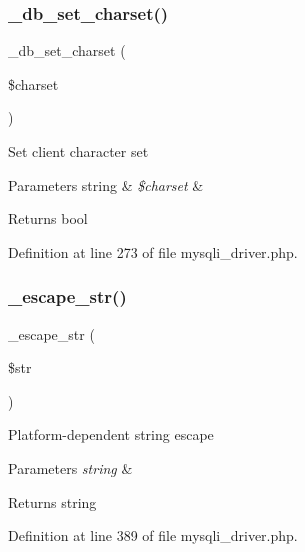 \subsubsection{\texorpdfstring{\_db\_set\_charset()}{\_db\_set\_charset()}}
{\footnotesize\ttfamily \+\_\+db\+\_\+set\+\_\+charset (\begin{DoxyParamCaption}\item[{}]{\$charset }\end{DoxyParamCaption})\hspace{0.3cm}{\ttfamily [protected]}}

Set client character set


\begin{DoxyParams}[1]{Parameters}
string & {\em \$charset} & \\
\hline
\end{DoxyParams}
\begin{DoxyReturn}{Returns}
bool 
\end{DoxyReturn}


Definition at line 273 of file mysqli\+\_\+driver.\+php.

\mbox{\label{class_c_i___d_b__mysqli__driver_af8ef0237bfcdb19215b63fff769e7a55}} 
\subsubsection{\texorpdfstring{\_escape\_str()}{\_escape\_str()}}
{\footnotesize\ttfamily \+\_\+escape\+\_\+str (\begin{DoxyParamCaption}\item[{}]{\$str }\end{DoxyParamCaption})\hspace{0.3cm}{\ttfamily [protected]}}

Platform-\/dependent string escape


\begin{DoxyParams}{Parameters}
{\em string} & \\
\hline
\end{DoxyParams}
\begin{DoxyReturn}{Returns}
string 
\end{DoxyReturn}


Definition at line 389 of file mysqli\+\_\+driver.\+php.

\mbox{\label{class_c_i___d_b__mysqli__driver_a114ab675d89bf8324a41785fb475e86d}} 

